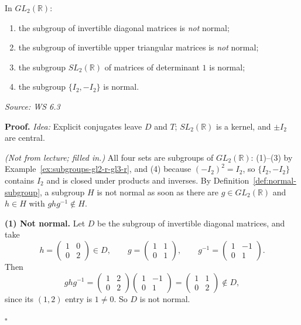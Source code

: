 \documentclass[11pt]{report}
\renewenvironment{proof}[1][Proof]{\noindent\textbf{#1.} }{\hfill$\square$\par\vspace{5pt}}
\newcommand{\srcline}[1]{\par\hfill{\footnotesize\textit{Source: #1}}}
\begin{document}
\begin{propbox}\label{prop:normal-subgroups-gl2-r}
In $GL_2(\mathbb{R})$:
\begin{enumerate}
    \item the subgroup of invertible diagonal matrices is \emph{not} normal;
    \item the subgroup of invertible upper triangular matrices is \emph{not} normal;
    \item the subgroup $SL_2(\mathbb{R})$ of matrices of determinant $1$ is normal;
    \item the subgroup $\{I_2, -I_2\}$ is normal.
\end{enumerate}
\srcline{WS 6.3}
\end{propbox}

\begin{proof}
\textit{Idea:} Explicit conjugates leave $D$ and $T$; $SL_2(\mathbb{R})$ is a kernel, and $\pm I_2$ are central.\par
\textit{(Not from lecture; filled in.)} All four sets are subgroups of $GL_2(\mathbb{R})$: (1)--(3) by Example~\ref{ex:subgroups-gl2-r-gl3-r}, and (4) because $(-I_2)^2 = I_2$, so $\{I_2, -I_2\}$ contains $I_2$ and is closed under products and inverses. By Definition~\ref{def:normal-subgroup}, a subgroup $H$ is not normal as soon as there are $g \in GL_2(\mathbb{R})$ and $h \in H$ with $ghg^{-1} \notin H$.

\textbf{(1) Not normal.} Let $D$ be the subgroup of invertible diagonal matrices, and take
\[ h = \begin{pmatrix} 1 & 0 \\ 0 & 2 \end{pmatrix} \in D, \qquad g = \begin{pmatrix} 1 & 1 \\ 0 & 1 \end{pmatrix}, \qquad g^{-1} = \begin{pmatrix} 1 & -1 \\ 0 & 1 \end{pmatrix}. \]
Then
\[ ghg^{-1} = \begin{pmatrix} 1 & 2 \\ 0 & 2 \end{pmatrix}\begin{pmatrix} 1 & -1 \\ 0 & 1 \end{pmatrix} = \begin{pmatrix} 1 & 1 \\ 0 & 2 \end{pmatrix} \notin D, \]
since its $(1,2)$ entry is $1 \neq 0$. So $D$ is not normal.


\end{proof}
\end{document}
